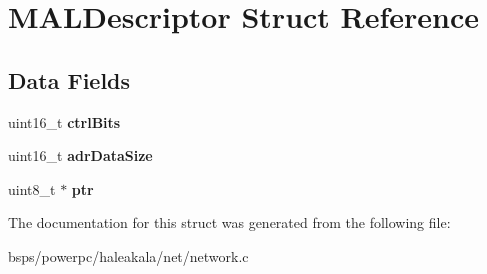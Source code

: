 \hypertarget{structMALDescriptor}{}\section{M\+A\+L\+Descriptor Struct Reference}
\label{structMALDescriptor}
\subsection*{Data Fields}
\begin{DoxyCompactItemize}
\item 
\mbox{\label{structMALDescriptor_a59923be77bf7000f69dee8d820ce79e1}} 
uint16\+\_\+t {\bfseries ctrl\+Bits}
\item 
\mbox{\label{structMALDescriptor_aa980efd5030ed186b9ffedd81d65be8c}} 
uint16\+\_\+t {\bfseries adr\+Data\+Size}
\item 
\mbox{\label{structMALDescriptor_a5d085df87f4f0b33a7f662ba61c4cee0}} 
uint8\+\_\+t $\ast$ {\bfseries ptr}
\end{DoxyCompactItemize}


The documentation for this struct was generated from the following file\+:\begin{DoxyCompactItemize}
\item 
bsps/powerpc/haleakala/net/network.\+c\end{DoxyCompactItemize}
